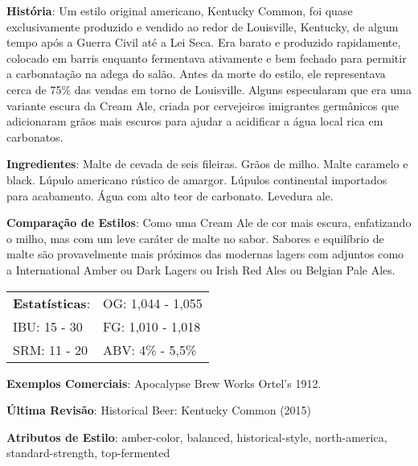 \textbf{História}: Um estilo original americano, Kentucky Common, foi quase exclusivamente produzido e vendido ao redor de Louisville, Kentucky, de algum tempo após a Guerra Civil até a Lei Seca. Era barato e produzido rapidamente, colocado em barris enquanto fermentava ativamente e bem fechado para permitir a carbonatação na adega do salão. Antes da morte do estilo, ele representava cerca de 75\% das vendas em torno de Louisville. Alguns especularam que era uma variante escura da Cream Ale, criada por cervejeiros imigrantes germânicos que adicionaram grãos mais escuros para ajudar a acidificar a água local rica em carbonatos.

\textbf{Ingredientes}: Malte de cevada de seis fileiras. Grãos de milho. Malte caramelo e black. Lúpulo americano rústico de amargor. Lúpulos continental importados para acabamento. Água com alto teor de carbonato. Levedura ale.

\textbf{Comparação de Estilos}: Como uma Cream Ale de cor mais escura, enfatizando o milho, mas com um leve caráter de malte no sabor. Sabores e equilíbrio de malte são provavelmente mais próximos das modernas lagers com adjuntos como a International Amber ou Dark Lagers ou Irish Red Ales ou Belgian Pale Ales.

\begin{tabular}{@{}p{35mm}p{35mm}@{}}
  \textbf{Estatísticas}: & OG: 1,044 - 1,055  \\
  IBU: 15 - 30  & FG: 1,010 - 1,018  \\
  SRM: 11 - 20 & ABV: 4\% - 5,5\%
\end{tabular}

\textbf{Exemplos Comerciais}: Apocalypse Brew Works Ortel's 1912.

\textbf{Última Revisão}: Historical Beer: Kentucky Common (2015)

\textbf{Atributos de Estilo}: amber-color, balanced, historical-style, north-america, standard-strength, top-fermented
